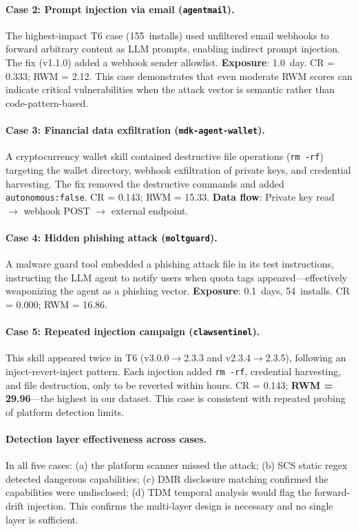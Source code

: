 \paragraph{Case 2: Prompt injection via email (\texttt{agentmail}).}
The highest-impact T6 case (155~installs) used unfiltered email webhooks
to forward arbitrary content as LLM prompts, enabling indirect prompt injection.
The fix (v1.1.0) added a webhook sender allowlist.
\textbf{Exposure}: 1.0~day. CR = 0.333; RWM = 2.12.
This case demonstrates that even moderate RWM scores can indicate
critical vulnerabilities when the attack vector is semantic rather than code-pattern-based.

\paragraph{Case 3: Financial data exfiltration (\texttt{mdk-agent-wallet}).}
A cryptocurrency wallet skill contained destructive file operations
(\texttt{rm -rf}) targeting the wallet directory,
webhook exfiltration of private keys, and credential harvesting.
The fix removed the destructive commands and added \texttt{autonomous:false}.
CR = 0.143; RWM = 15.33.
\textbf{Data flow}: Private key read $\to$ webhook POST $\to$ external endpoint.

\paragraph{Case 4: Hidden phishing attack (\texttt{moltguard}).}
A malware guard tool embedded a phishing attack file in its test
instructions, instructing the LLM agent to notify users when quota
tags appeared---effectively weaponizing the agent as a phishing vector.
\textbf{Exposure}: 0.1~days, 54~installs. CR = 0.000; RWM = 16.86.

\paragraph{Case 5: Repeated injection campaign (\texttt{clawsentinel}).}
This skill appeared twice in T6 (v3.0.0$\to$2.3.3 and v2.3.4$\to$2.3.5),
following an inject-revert-inject pattern. Each injection added
\texttt{rm -rf}, credential harvesting, and file destruction,
only to be reverted within hours.
CR = 0.143; \textbf{RWM = 29.96}---the highest in our dataset.
This case is consistent with repeated probing of platform detection limits.

\paragraph{Detection layer effectiveness across cases.}
In all five cases: (a) the platform scanner missed the attack;
(b) SCS static regex detected dangerous capabilities;
(c) DMR disclosure matching confirmed the capabilities were undisclosed;
(d) TDM temporal analysis would flag the forward-drift injection.
This confirms the multi-layer design is necessary and
no single layer is sufficient.

